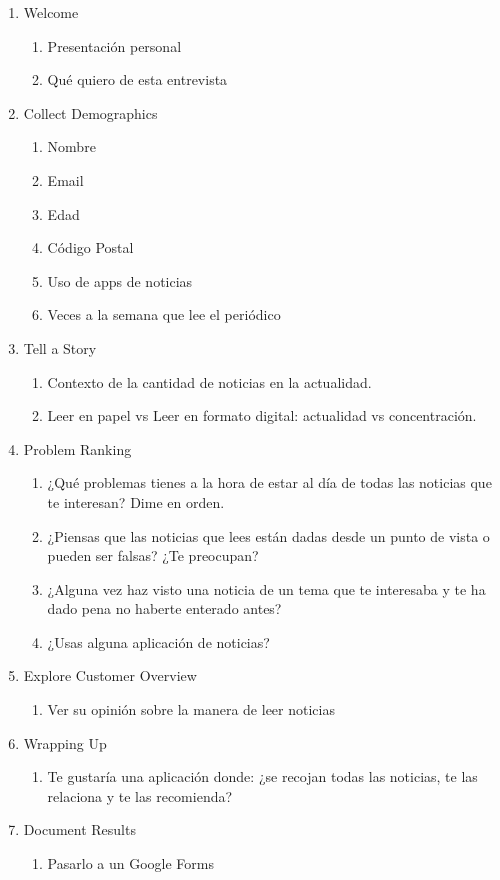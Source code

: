 \begin{enumerate}
    \item Welcome
    \begin{enumerate}
        \item Presentación personal
        \item Qué quiero de esta entrevista
    \end{enumerate}
    \item Collect Demographics
    \begin{enumerate}
        \item Nombre
        \item Email
        \item Edad
        \item Código Postal
        \item Uso de apps de noticias
        \item Veces a la semana que lee el periódico
    \end{enumerate}
    \item Tell a Story
    \begin{enumerate}
        \item Contexto de la cantidad de noticias en la actualidad.
        \item Leer en papel vs Leer en formato digital: actualidad vs concentración.
    \end{enumerate}
    \item Problem Ranking
    \begin{enumerate}
        \item ¿Qué problemas tienes a la hora de estar al día de todas las noticias que te interesan? Dime en orden.
        \item ¿Piensas que las noticias que lees están dadas desde un punto de vista o pueden ser falsas? ¿Te preocupan?
        \item ¿Alguna vez haz visto una noticia de un tema que te interesaba y te ha dado pena no haberte enterado antes?
        \item ¿Usas alguna aplicación de noticias?
    \end{enumerate}
    \item Explore Customer Overview
    \begin{enumerate}
        \item Ver su opinión sobre la manera de leer noticias
    \end{enumerate}
    \item Wrapping Up
    \begin{enumerate}
        \item Te gustaría una aplicación donde: ¿se recojan todas las noticias, te las relaciona y te las recomienda?
    \end{enumerate}
    \item Document Results
    \begin{enumerate}
        \item Pasarlo a un Google Forms
    \end{enumerate}
\end{enumerate}


